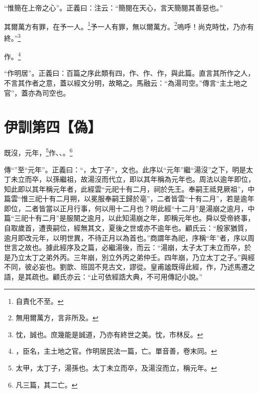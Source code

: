 {\noindent\shu{}\fzkt “惟簡在上帝之心”。正義曰：注云：“簡閱在天心，言天簡閱其善惡也。” \par}

其爾萬方有罪，在予一人。\footnote{自責化不至。}予一人有罪，無以爾萬方。\footnote{無用爾萬方，言非所及。}嗚呼！尚克時忱，乃亦有終。”\footnote{忱，誠也。庶幾能是誠道，乃亦有終世之美。忱，市林反。}

作。\footnote{，臣名，主土地之官。作明居民法一篇，亡。單音善，卷末同。}

{\noindent\shu{}\fzkt “作明居”。正義曰：百篇之序此類有四，作、作、作，與此篇。直言其所作之人，不言其作者之意，蓋以經文分明，故略之。馬融云：“為湯司空。”傳言“主土地之官”，蓋亦為司空也。 \par}

\section{伊訓第四【偽】}


既沒，元年，\footnote{太甲，太丁子，湯孫也。太丁未立而卒，及湯沒而立，稱元年。}作、、。\footnote{凡三篇，其二亡。}


{\noindent\zhuan{}\fzbyks 傳“”至“元年”。正義曰：“，太丁子”，文也。此序以“元年”繼“湯沒”之下，明是太丁未立而卒，以孫繼祖，故湯沒而代立，即以其年稱為元年也。周法以逾年即位，知此即以其年稱元年者，此經雲“元祀十有二月，祠於先王。奉嗣王祗見厥祖”，中篇雲“惟三祀十有二月朔，以冕服奉嗣王歸於亳”，二者皆雲“十有二月”，若是逾年即位，二者皆當以正月行事，何以用十二月也？明此經“十二月”是湯崩之逾月，中篇“三祀十有二月”是服闋之逾月，以此知湯崩之年，即稱元年也。舜以受帝終事，自取歲首，遭喪嗣位，經無其文，夏後之世或亦不逾年也。顧氏云：“殷家猶質，逾月即改元年，以明世異，不待正月以為首也。”商謂年為祀，序稱“年”者，序以周世言之故也。據此經序及之篇，必繼湯後，而云：“湯崩，太子太丁未立而卒，於是乃立太丁之弟外丙。三年崩，別立外丙之弟仲壬。四年崩，乃立太丁之子。”與經不同，彼必妄也。劉歆、班固不見古文，謬從。皇甫謐既得此經，作，乃述馬遷之語，是其疏也。顧氏亦云：“止可依經誥大典，不可用傳記小說。” \par}

